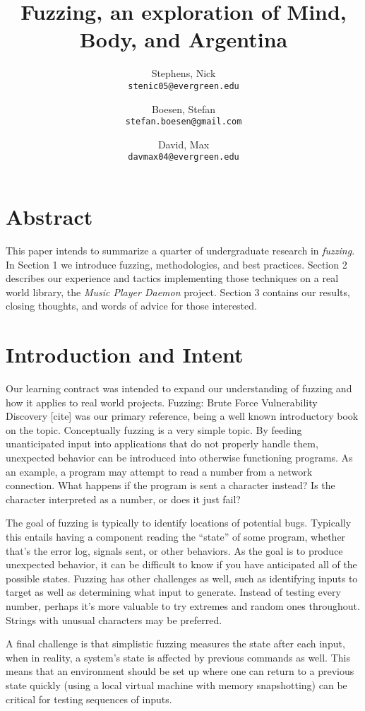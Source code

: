 \documentclass[10pt]{article}
\author{
  Stephens, Nick\\
  \texttt{stenic05@evergreen.edu}
  \and
  Boesen, Stefan\\
  \texttt{stefan.boesen@gmail.com}
  \and
  David, Max\\
  \texttt{davmax04@evergreen.edu}
}
\title{Fuzzing, an exploration of Mind, Body, and Argentina}
\begin{document}
  \maketitle

\section*{Abstract}
This paper intends to summarize a quarter of undergraduate research in \emph{fuzzing}. In Section 1 we introduce fuzzing, methodologies, and best practices. Section 2 describes our experience and tactics implementing those techniques on a real world library, the \emph{Music Player Daemon} project. Section 3 contains our results, closing thoughts, and words of advice for those interested.

\section{Introduction and Intent}
Our learning contract was intended to expand our understanding of fuzzing and how it applies to real world projects. Fuzzing: Brute Force Vulnerability Discovery [cite] was our primary reference, being a well known introductory book on the topic. Conceptually fuzzing is a very simple topic. By feeding unanticipated input into applications that do not properly handle them, unexpected behavior can be introduced into otherwise functioning programs. As an example, a program may attempt to read a number from a network connection. What happens if the program is sent a character instead? Is the character interpreted as a number, or does it just fail? 

The goal of fuzzing is typically to identify locations of potential bugs. Typically this entails having a component reading the ``state'' of some program, whether that's the error log, signals sent, or other behaviors. As the goal is to produce unexpected behavior, it can be difficult to know if you have anticipated all of the possible states. Fuzzing has other challenges as well, such as identifying inputs to target as well as determining what input to generate. Instead of testing every number, perhaps it's more valuable to try extremes and random ones throughout. Strings with unusual characters may be preferred.

A final challenge is that simplistic fuzzing measures the state after each input, when in reality, a system's state is affected by previous commands as well. This means that an environment should be set up where one can return to a previous state quickly (using a local virtual machine with memory snapshotting) can be critical for testing sequences of inputs.
\end{document}
